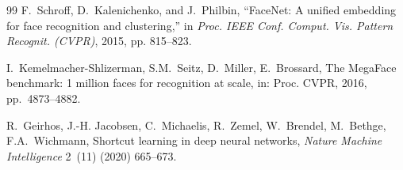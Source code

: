 \documentclass[preprint,12pt]{elsarticle}
\begin{document}
\begin{thebibliography}{99}
F.~Schroff, D.~Kalenichenko, and J.~Philbin, ``FaceNet: A unified embedding for face recognition and clustering,'' in \emph{Proc. IEEE Conf. Comput. Vis. Pattern Recognit. (CVPR)}, 2015, pp. 815--823.

I.~Kemelmacher-Shlizerman, S.M.~Seitz, D.~Miller, E.~Brossard, The MegaFace
benchmark: 1 million faces for recognition at scale, in: Proc. CVPR, 2016,
pp.~4873--4882.

R.~Geirhos, J.-H. Jacobsen, C.~Michaelis, R.~Zemel, W.~Brendel, M.~Bethge,
F.A.~Wichmann, Shortcut learning in deep neural networks, \emph{Nature
Machine Intelligence} 2~(11) (2020) 665--673.

\end{thebibliography}
\end{document}
